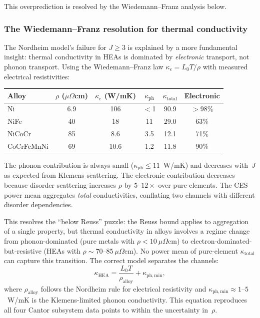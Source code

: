 \documentclass[12pt,letterpaper]{article}
\theoremstyle{definition}
\begin{document}
This overprediction is resolved by the Wiedemann--Franz analysis below.

\subsubsection{The Wiedemann--Franz resolution for thermal conductivity}

The Nordheim model's failure for $J \geq 3$ is explained by a more fundamental insight: thermal conductivity in HEAs is dominated by \emph{electronic} transport, not phonon transport.  Using the Wiedemann--Franz law $\kappa_e = L_0 T / \rho$ with measured electrical resistivities:

\begin{center}
\begin{tabular}{@{}lccccc@{}}
\toprule
Alloy & $\rho$ ($\mu\Omega$cm) & $\kappa_e$ (W/mK) & $\kappa_{\mathrm{ph}}$ & $\kappa_{\mathrm{total}}$ & Electronic \\
\midrule
Ni     & 6.9  & 106 & $<$1 & 90.9 & $>$98\% \\
NiFe   & 40   & 18  & 11   & 29.0 & 63\% \\
NiCoCr & 85   & 8.6 & 3.5  & 12.1 & 71\% \\
CoCrFeMnNi & 69 & 10.6 & 1.2 & 11.8 & 90\% \\
\bottomrule
\end{tabular}
\end{center}

The phonon contribution is always small ($\kappa_{\mathrm{ph}} \leq 11$~W/mK) and decreases with~$J$ as expected from Klemens scattering.  The electronic contribution decreases because disorder scattering increases $\rho$ by $5$--$12\times$ over pure elements.  The CES power mean aggregates \emph{total} conductivities, conflating two channels with different disorder dependencies.

This resolves the ``below Reuss'' puzzle: the Reuss bound applies to aggregation of a single property, but thermal conductivity in alloys involves a regime change from phonon-dominated (pure metals with $\rho < 10~\mu\Omega$cm) to electron-dominated-but-resistive (HEAs with $\rho \sim 70$--$85~\mu\Omega$cm).  No power mean of pure-element $\kappa_{\mathrm{total}}$ can capture this transition.  The correct model separates the channels:
\begin{equation}\label{eq:kappa_v2}
  \kappa_{\mathrm{HEA}} = \frac{L_0 T}{\rho_{\mathrm{alloy}}} + \kappa_{\mathrm{ph,min}},
\end{equation}
where $\rho_{\mathrm{alloy}}$ follows the Nordheim rule for electrical resistivity and $\kappa_{\mathrm{ph,min}} \approx 1$--$5$~W/mK is the Klemens-limited phonon conductivity.  This equation reproduces all four Cantor subsystem data points to within the uncertainty in~$\rho$.
\end{document}

